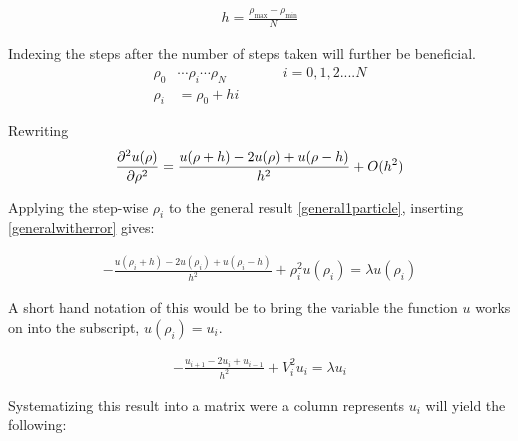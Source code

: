 \begin{align*}
	h=\frac{\rho_\mathrm{max}-\rho_\mathrm{min}}{N}
\end{align*} 

Indexing the steps after the number of steps taken will further be beneficial.
\begin{align*}
	\rho_0&\cdots\rho_i\cdots\rho_N \qquad \qquad i=0,1,2....N\\
	\rho_i&=\rho_0+hi
\end{align*}

Rewriting 
\begin{align}
	\pdv[2]{u(\rho)}{\rho}=\frac{u(\rho+h)-2u(\rho)+u(\rho-h)}{h^2}+O(h^2)
\end{align}

Applying the step-wise $\rho_i$ to the general result \ref{general1particle}, inserting \ref{generalwitherror} gives:

\begin{align*}
	-\frac{u(\rho_i+h)-2u(\rho_i)+u(\rho_i-h)}{h^2}+\rho_i^2u(\rho_i)=\lambda u(\rho_i)	
\end{align*}

A short hand notation of this would be to bring the variable the function $u$ works on into the subscript, $u(\rho_i)=u_i$.

\begin{align}
	-\frac{u_{i+1}-2u_i+u_{i-1}}{h^2}+V_i^2u_i=\lambda u_i
\end{align}

Systematizing this result into a matrix were a column represents $u_i$ will yield the following:

